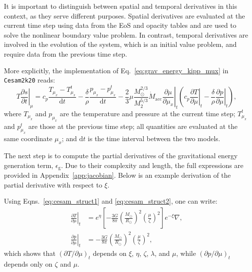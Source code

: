 \documentclass[12pt,a4paper]{article}
\newcommand{\mr}{\mathrm}
\newcommand{\pfird}[2][]{\frac{\partial#1}{\partial#2}}
\newcommand{\dd}[1]{\mathrm{d}#1}
\begin{document}
It is important to distinguish between spatial and temporal derivatives in this context, as they serve different purposes. Spatial derivatives are evaluated at the current time step using data from the EoS and opacity tables and are used to solve the nonlinear boundary value problem. In contrast, temporal derivatives are involved in the evolution of the system, which is an initial value problem, and require data from the previous time step.

More explicitly, the implementation of Eq.~\eqref{eq:grav_energy_kipp_mux} in \texttt{Cesam2k20} reads:
\begin{equation}
  T\left.\pfird[s]{t}\right|_\mu = c_p\frac{T_{\mu_x} - T_{\mu_x}^t}{\dd{t}} - \frac{\delta}{\rho}\frac{p_{\mu_x} - p_{\mu_x}^t}{\dd{t}} - \frac{2}{3}\mu\frac{M_\odot^{2/3}}{M_2^{5/3}}\dot{M}_\mr{acc}\left.\pfird[\mu]{\mu_x}\right|_t\left(c_p\left.\pfird[T]{\mu}\right|_t - \frac{\delta}{\rho}\left.\pfird[p]{\mu}\right|_t\right),
\end{equation}
where $T_{\mu_x}$ and $p_{\mu_x}$ are the temperature and pressure at the current time step; $T_{\mu_x}^t$ and $p_{\mu_x}^t$ are those at the previous time step; all quantities are evaluated at the same coordinate $\mu_x$; and $\dd{t}$ is the time interval between the two models. 

The next step is to compute the partial derivatives of the gravitational energy generation term, $\epsilon_\mr{g}$. Due to their complexity and length, the full expressions are provided in Appendix~\ref{app:jacobian}. Below is an example derivation of the partial derivative with respect to $\xi$.

Using Eqns.~\eqref{eq:cesam_struct1} and \eqref{eq:cesam_struct2}, one can write: 
\begin{align}
  \left.\pfird[T]{\mu}\right|_t &= e^\eta\left[-\frac{3G}{8\pi}\left(\frac{M_\odot}{R_\odot}\right)^2\left(\frac{\mu}{\zeta}\right)^2\right]e^{-\xi}\nabla,\\
  \left.\pfird[p]{\mu}\right|_t &= -\frac{3G}{8\pi}\left(\frac{M_\odot}{R_\odot}\right)^2\left(\frac{\mu}{\zeta}\right)^2,
\end{align}
which shows that $\left(\partial T/\partial \mu\right)_t$ depends on $\xi$, $\eta$, $\zeta$, $\lambda$, and $\mu$, while $\left(\partial p/\partial \mu\right)_t$ depends only on $\zeta$ and $\mu$.
\end{document}

